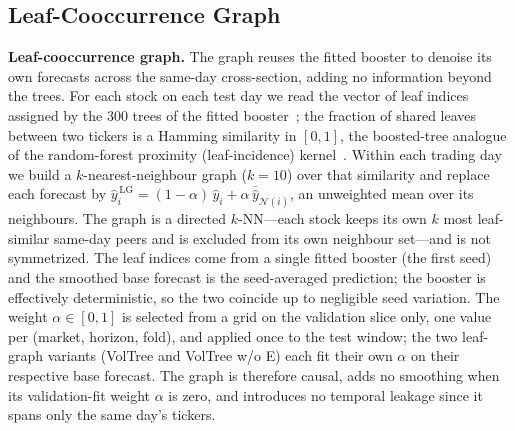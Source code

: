 \documentclass[runningheads,a4paper]{llncs}
\begin{document}
\subsection{Leaf-Cooccurrence Graph}
\textbf{Leaf-cooccurrence graph.} The graph reuses the fitted booster to denoise its own forecasts across
the same-day cross-section, adding no information beyond the trees. For each stock on each test day we read
the vector of leaf indices assigned by the 300 trees of the fitted booster~\cite{chen2016}; the fraction
of shared leaves between two tickers is a Hamming similarity in $[0,1]$, the boosted-tree analogue of the
random-forest proximity (leaf-incidence) kernel~\cite{rhodes2023}. Within each trading day we build a $k$-nearest-neighbour graph
($k=10$) over that similarity and replace each forecast by
$\hat y_i^{\,\mathrm{LG}}=(1-\alpha)\,\hat y_i+\alpha\,\overline{\hat y}_{\mathcal{N}(i)}$, an unweighted
mean over its neighbours. The graph is a directed $k$-NN---each stock keeps its own $k$ most leaf-similar
same-day peers and is excluded from its own neighbour set---and is not symmetrized. The leaf indices come
from a single fitted booster (the first seed) and the smoothed base forecast is the seed-averaged
prediction; the booster is effectively deterministic, so the two coincide up to negligible seed variation. The weight $\alpha\in[0,1]$ is selected from a grid on the validation slice only,
one value per (market, horizon, fold), and applied once to the test window; the two leaf-graph variants (VolTree and VolTree w/o E) each fit
their own $\alpha$ on their respective base forecast. The graph is therefore causal, adds no smoothing
when its validation-fit weight $\alpha$ is zero, and introduces no temporal leakage since it spans only the same
day's tickers.
\end{document}

